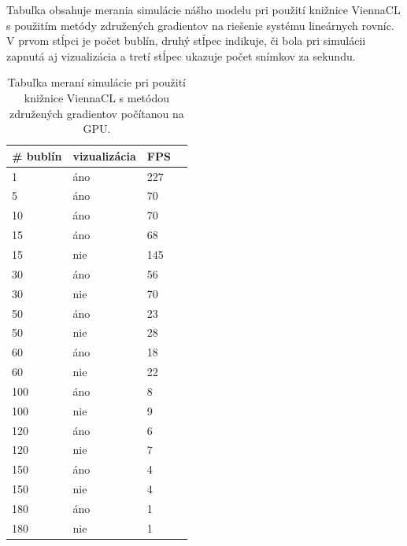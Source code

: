 \noindent
Tabuľka  obsahuje merania simulácie nášho modelu pri použití knižnice ViennaCL \cite{viennacl} s použitím metódy združených gradientov na riešenie systému lineárnych rovníc. V prvom stĺpci je počet bublín, druhý stĺpec indikuje, či bola pri simulácii zapnutá aj vizualizácia a tretí stĺpec ukazuje počet snímkov za sekundu.

\begin{table}[H]
	\caption{Tabuľka meraní simulácie pri použití knižnice ViennaCL \cite{viennacl} s metódou združených gradientov počítanou na GPU.}
	\label{table:viennacl_measurement}
	\setlength{\extrarowheight}{2pt}
	\begin{tabularx}{\textwidth}{|X|X|X|X|}
		\hline
		\textbf{\# bublín} & \textbf{vizualizácia} & \textbf{FPS} \\ \hline
		1         & áno                   & 227          \\ \hline
		5         & áno                   & 70          \\ \hline
		10        & áno                   & 70          \\ \hline
		15        & áno                   & 68           \\ \hline
		15        & nie                   & 145          \\ \hline
		30        & áno                   & 56           \\ \hline
		30        & nie                   & 70           \\ \hline
		50        & áno                   & 23           \\ \hline
		50        & nie                   & 28           \\ \hline
		60        & áno                   & 18           \\ \hline
		60        & nie                   & 22           \\ \hline
		100       & áno                   & 8            \\ \hline
		100       & nie                   & 9            \\ \hline
		120       & áno                   & 6            \\ \hline
		120       & nie                   & 7            \\ \hline
		150       & áno                   & 4            \\ \hline
		150       & nie                   & 4            \\ \hline
		180       & áno                   & 1            \\ \hline
		180       & nie                   & 1            \\ \hline
	\end{tabularx}
\end{table}


